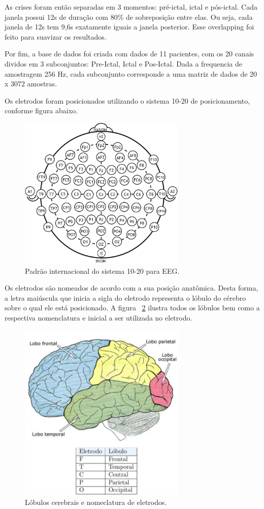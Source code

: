 \documentclass[
	12pt,				%
	openright,			%
	twoside,			%
	a4paper,			%
	english,			%
	french,				%
	spanish,			%
	brazil				%
	]{abntex2}
\begin{document}
As crises foram então separadas em 3 momentos: pré-ictal, ictal e pós-ictal. Cada janela possui 12s de duração com 80\% de sobreposição entre elas. Ou seja, cada janela de 12s tem 9,6s exatamente iguais a janela posterior. Esse overlapping foi feito para suavizar os resultados.

Por fim, a base de dados foi criada com dados de 11 pacientes, com os 20 canais  dividos em 3 subconjuntos: Pre-Ictal, Ictal e Pos-Ictal. Dada a frequencia de amostragem 256 Hz, cada subconjunto corresponde a uma matriz de dados de 20 x 3072 amostras.

Os eletrodos foram posicionados utilizando o sistema 10-20 de posicionamento, conforme figura abaixo. 

\begin{figure}[h]
\centering
\includegraphics[width=8cm]{figs/10-20.JPG}
\caption{Padrão internacional do sistema 10-20 para EEG.}
\label{fig: 10-20}
\end{figure}

Os eletrodos são nomeados de acordo com a sua posição anatômica. Desta forma, a letra maiúscula que inicia a sigla do eletrodo representa o lóbulo do cérebro sobre o qual ele está posicionado. A figura ~\ref{fig: lobulos} ilustra todos os lóbulos bem como a respectiva nomenclatura e inicial a ser utilizada no eletrodo. 

\begin{figure}[h]
\centering
\includegraphics[width=8cm]{figs/lobulos.JPG}
\caption{Lóbulos cerebrais e nomeclatura de eletrodos.}
\label{fig: lobulos}
\end{figure}
\end{document}
